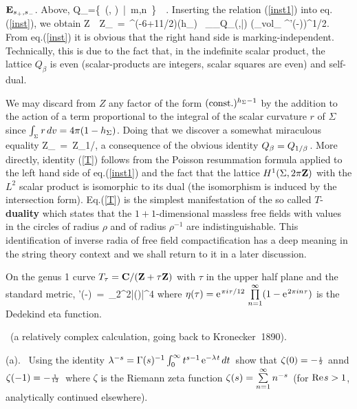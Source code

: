 ${{\bf E}}_{s_+,s_-}$. Above,
\qq
Q_\beta\s=\s\{\ (\s,
)\ |\ m,n\in\NZ\ \}\
\subset\ \NR\oplus\NR\s.
\non
\qqq
Inserting the relation (\ref{inst1}) into eq.\s\s(\ref{inst}), we obtain
\qq
Z\ \equiv\ Z_\beta\ =\ \ee^{\m(-6\ln{2\pi}+11\ln{\beta}/2)(h_)}
\ \vartheta_{_{Q_\beta}}(\tau,\bar\tau)
\left({_{{\rm vol}_\Sigma\s\s{}}
\over^{\det'(-\Delta)}}\right)^{{\hs{-0.06cm}1/2}}\s.
\non
\qqq
{}From eq.\s\s(\ref{inst}) it is obvious that the right hand side
is marking-independent. Technically, this is due to the fact that,
in the indefinite scalar product, the lattice $Q_\beta$ is even
(scalar-products are integers, scalar squares are even) and self-dual.
\vskip 0.3cm

We may discard from $Z$ any factor of the form $({\rm const.}
)^{h_\Sigma-1}$ by the addition to the action of a term proportional
to the integral of the scalar curvature $r$ of $\Sigma$
since $\int_{_\Sigma} r\hspace{0.05cm} dv=4\pi(1-h_\Sigma)$. Doing that we discover
a somewhat miraculous equality
\qq
Z_\beta\ =\ Z_{1/\beta}\s,
\label{T}
\qqq
a consequence of the obvious identity \s$Q_\beta=Q_{1/\beta}\hspace{0.05cm}$.
More directly, identity (\ref{T}) follows from the Poisson
resummation formula applied to the left hand side of
eq.\s\s(\ref{inst1}) and the fact that the lattice
$H^1(\Sigma,2\pi{{\bf Z}})$ with the $L^2$ scalar product
is isomorphic to its dual (the isomorphism  is induced
by the intersection form). Eq.\s\s(\ref{T}) is the simplest
manifestation of the so called $T$-{\bf duality}
which states that the $1+1$-dimensional massless free fields with
values in the circles of radius $\rho$ and of radius $\rho^{-1}$ are
indistinguishable. This identification
of inverse radia of free field compactification has a deep
meaning in the string theory context and we shall return to it
in a later discussion.
\vskip 0.3cm

On the genus 1 curve $T_\tau={{\bf C}}/({{\bf Z}}+\tau{{\bf Z}})$ with $\tau$ in
the upper half plane and the standard metric,
\qq
{\det}'(-\Delta)\ =\ \tau_2^2\s|\eta(\tau)|^4
\non
\qqq
where $\eta(\tau)={\rm e}^{\hspace{0.025cm}\pi i\tau/12}\hspace{0.05cm}\prod\limits_{n=1}^\infty
(1-{\rm e}^{\hspace{0.025cm} 2\pi in\tau})$ is the Dedekind eta function.
\vskip 0.5cm

\s\s\ (a relatively complex calculation, going
back to Kronecker $~$1890).
\vskip 0.2cm

\no (a). \ Using the identity \s$\lambda^{-s}=\Gamma(s)^{-1}\int_0^\infty
t^{s-1}\hspace{0.05cm}{\rm e}^{-\lambda\hspace{0.025cm} t}\hspace{0.05cm} dt\hspace{0.05cm}$ show that \s$\zeta(0)=-{_1\over^2}$
annd \s$\zeta(-1)=-{_1\over^{12}}\hspace{0.05cm}$
where $\zeta$ is the Riemann zeta function \s$\zeta(s)=
\sum\limits_{n=1}^\infty n^{-s}\hspace{0.05cm}$ (for \s${\rm Re}\hspace{0.025cm} s>1$,
analytically continued elsewhere).
\vskip 0.2cm

